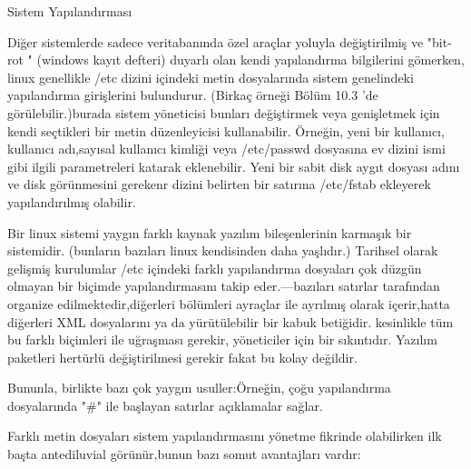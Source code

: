 \begin{section}{Sistem Yapılandırması}

Diğer sistemlerde sadece veritabanında özel araçlar yoluyla değiştirilmiş ve "bit-rot " (windows kayıt defteri) duyarlı  olan  kendi yapılandırma bilgilerini gömerken,  linux genellikle /etc dizini içindeki metin dosyalarında sistem genelindeki yapılandırma girişlerini bulundurur. (Birkaç örneği Bölüm 10.3 'de görülebilir.)burada sistem yöneticisi bunları değiştirmek veya genişletmek için kendi seçtikleri bir metin düzenleyicisi kullanabilir. Örneğin, yeni bir kullanıcı, kullanıcı adı,sayısal kullanıcı kimliği veya /etc/passwd dosyasına ev dizini ismi gibi ilgili parametreleri katarak eklenebilir. Yeni bir sabit disk aygıt dosyası adını ve disk görünmesini gerekenr dizini belirten bir satırına /etc/fstab ekleyerek yapılandırılmış olabilir.

Bir linux sistemi yaygın farklı kaynak yazılım bileşenlerinin karmaşık bir sistemidir. (bunların bazıları linux kendisinden daha yaşlıdır.) Tarihsel olarak gelişmiş kurulumlar  /etc içindeki farklı yapılandırma dosyaları çok düzgün olmayan bir biçimde yapılandırmasını takip eder.—bazıları satırlar 
tarafından organize edilmektedir,diğerleri bölümleri ayraçlar ile ayrılmış olarak içerir,hatta diğerleri XML dosyalarını ya da yürütülebilir bir kabuk betiğidir.
kesinlikle tüm bu farklı biçimleri ile uğraşması gerekir, yöneticiler  için bir sıkıntıdır. Yazılım paketleri hertürlü değiştirilmesi gerekir fakat bu kolay değildir.

Bununla, birlikte bazı çok yaygın usuller:Örneğin, çoğu yapılandırma dosyalarında "\#" ile başlayan satırlar açıklamalar sağlar.

Farklı metin dosyaları sistem yapılandırmasını yönetme fikrinde olabilirken ilk başta antediluvial görünür,bunun bazı somut avantajları vardır:


\end{section}

